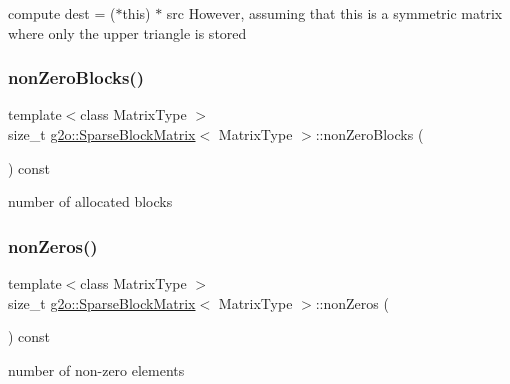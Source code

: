 compute dest = ($\ast$this) $\ast$ src However, assuming that this is a symmetric matrix where only the upper triangle is stored \mbox{\label{classg2o_1_1_sparse_block_matrix_a3f9e289e4039e668d33ad565a637e39a}} 
\subsubsection{\texorpdfstring{non\+Zero\+Blocks()}{nonZeroBlocks()}}
{\footnotesize\ttfamily template$<$class Matrix\+Type $>$ \\
size\+\_\+t \mbox{\hyperlink{classg2o_1_1_sparse_block_matrix}{g2o\+::\+Sparse\+Block\+Matrix}}$<$ Matrix\+Type $>$\+::non\+Zero\+Blocks (\begin{DoxyParamCaption}{ }\end{DoxyParamCaption}) const}



number of allocated blocks 

\mbox{\label{classg2o_1_1_sparse_block_matrix_a06dc97167a923119bdf99818033104d8}} 
\subsubsection{\texorpdfstring{non\+Zeros()}{nonZeros()}}
{\footnotesize\ttfamily template$<$class Matrix\+Type $>$ \\
size\+\_\+t \mbox{\hyperlink{classg2o_1_1_sparse_block_matrix}{g2o\+::\+Sparse\+Block\+Matrix}}$<$ Matrix\+Type $>$\+::non\+Zeros (\begin{DoxyParamCaption}{ }\end{DoxyParamCaption}) const}



number of non-\/zero elements 

\mbox{\label{classg2o_1_1_sparse_block_matrix_a7efaf2e4ea855f6faf500f9feacf3d3e}} 
